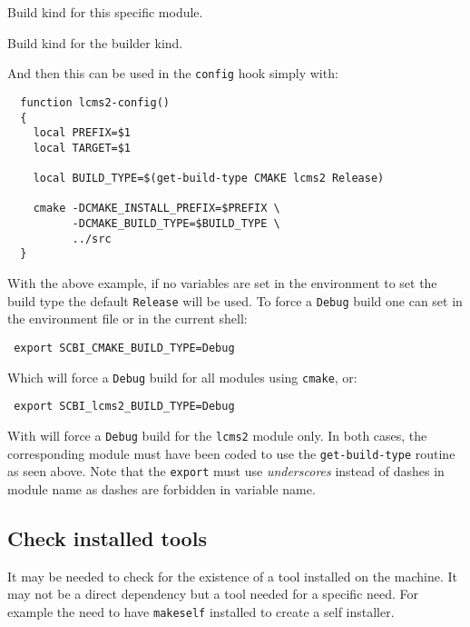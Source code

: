 \documentclass[a4paper,12pt,twoside]{article}
\newcommand{\code}[1]{\texttt{#1}}
\renewcommand{\emph}[1]{\textit{#1}}
\begin{document}
\begin{description}[style=nextline]
	\item [SCBI\_<module>\_BUILD\_TYPE] Build kind for this specific module.
	\item [SCBI\_<CONFIG>\_BUILD\_TYPE] Build kind for the builder kind.
\end{description}

And then this can be used in the \code{config} hook simply with:

\begin{lstlisting}
  function lcms2-config()
  {
    local PREFIX=$1
    local TARGET=$1

    local BUILD_TYPE=$(get-build-type CMAKE lcms2 Release)

    cmake -DCMAKE_INSTALL_PREFIX=$PREFIX \
          -DCMAKE_BUILD_TYPE=$BUILD_TYPE \
          ../src
  }
\end{lstlisting}

With the above example, if no variables are set in the environment to set the build type the default \code{Release} will be used. To force a \code{Debug} build one can set in the environment file or in the current shell:

\begin{lstlisting}
 export SCBI_CMAKE_BUILD_TYPE=Debug
\end{lstlisting}

Which will force a \code{Debug} build for all modules using \code{cmake}, or:

\begin{lstlisting}
 export SCBI_lcms2_BUILD_TYPE=Debug
\end{lstlisting}

With will force a \code{Debug} build for the \code{lcms2} module only. In both cases, the corresponding module must have been coded to use the \code{get-build-type} routine as seen above. Note that the \code{export} must use \emph{underscores} instead of dashes in module name as dashes are forbidden in variable name.

\subsection{Check installed tools}

It may be needed to check for the existence of a tool installed on the machine. It may not be a direct dependency but a tool needed for a specific need. For example the need to have \code{makeself} installed to create a self installer.
\end{document}
